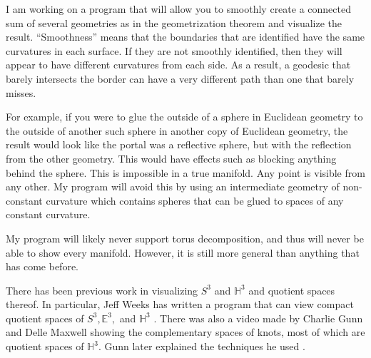 \documentclass[12pt]{amsart}
\begin{document}

I am working on a program that will allow you to smoothly create a connected sum of several geometries as in the geometrization theorem and visualize the result. ``Smoothness'' means that the boundaries that are identified have the same curvatures in each surface. If they are not smoothly identified, then they will appear to have different curvatures from each side. As a result, a geodesic that barely intersects the border can have a very different path than one that barely misses.

For example, if you were to glue the outside of a sphere in Euclidean geometry to the outside of another such sphere in another copy of Euclidean geometry, the result would look like the portal was a reflective sphere, but with the reflection from the other geometry. This would have effects such as blocking anything behind the sphere. This is impossible in a true manifold. Any point is visible from any other. My program will avoid this by using an intermediate geometry of non-constant curvature which contains spheres that can be glued to spaces of any constant curvature.

My program will likely never support torus decomposition, and thus will never be able to show every manifold. However, it is still more general than anything that has come before.






There has been previous work in visualizing $S^3$ and $\mathbb{H}^3$ and quotient spaces thereof. In particular, Jeff Weeks has written a program that can view compact quotient spaces of $S^3, \mathbb{E}^3,$ and $\mathbb{H}^3$ \cite{CurvedSpaces}. There was also a video made by Charlie Gunn and Delle Maxwell showing the complementary spaces of knots, most of which are quotient spaces of $\mathbb{H}^3$. \cite{NotKnot} Gunn later explained the techniques he used  \cite{CharlieGunn}.
\end{document}
